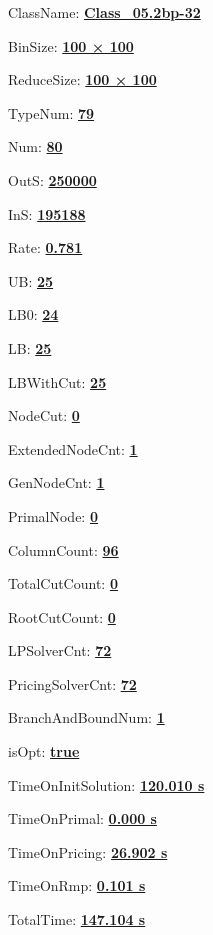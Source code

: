 \documentclass[11pt]{article}
\begin{document}
\pagestyle{empty}


ClassName: \underline{\textbf{Class_05.2bp-32}}
\par
BinSize: \underline{\textbf{100 × 100}}
\par
ReduceSize: \underline{\textbf{100 × 100}}
\par
TypeNum: \underline{\textbf{79}}
\par
Num: \underline{\textbf{80}}
\par
OutS: \underline{\textbf{250000}}
\par
InS: \underline{\textbf{195188}}
\par
Rate: \underline{\textbf{0.781}}
\par
UB: \underline{\textbf{25}}
\par
LB0: \underline{\textbf{24}}
\par
LB: \underline{\textbf{25}}
\par
LBWithCut: \underline{\textbf{25}}
\par
NodeCut: \underline{\textbf{0}}
\par
ExtendedNodeCnt: \underline{\textbf{1}}
\par
GenNodeCnt: \underline{\textbf{1}}
\par
PrimalNode: \underline{\textbf{0}}
\par
ColumnCount: \underline{\textbf{96}}
\par
TotalCutCount: \underline{\textbf{0}}
\par
RootCutCount: \underline{\textbf{0}}
\par
LPSolverCnt: \underline{\textbf{72}}
\par
PricingSolverCnt: \underline{\textbf{72}}
\par
BranchAndBoundNum: \underline{\textbf{1}}
\par
isOpt: \underline{\textbf{true}}
\par
TimeOnInitSolution: \underline{\textbf{120.010 s}}
\par
TimeOnPrimal: \underline{\textbf{0.000 s}}
\par
TimeOnPricing: \underline{\textbf{26.902 s}}
\par
TimeOnRmp: \underline{\textbf{0.101 s}}
\par
TotalTime: \underline{\textbf{147.104 s}}
\par
\newpage


\end{document}
